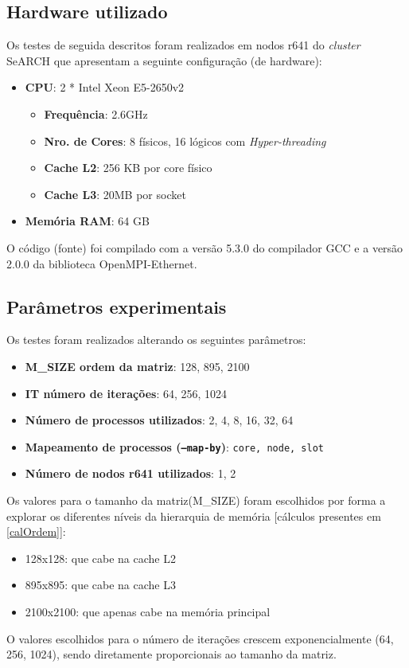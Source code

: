 \documentclass{article}
\begin{document}
\subsection{Hardware utilizado}
Os testes de seguida descritos foram realizados em nodos r641 do \textit{cluster} SeARCH que apresentam
a seguinte configuração (de hardware):
\begin{itemize}
    \item \textbf{CPU}: 2 * Intel Xeon E5-2650v2
        \begin{itemize}
            \item \textbf{Frequência}: 2.6GHz
            \item \textbf{Nro. de Cores}: 8 físicos, 16 lógicos com \textit{Hyper-threading}
            \item \textbf{Cache L2}: 256 KB por core físico
            \item \textbf{Cache L3}: 20MB por socket
        \end{itemize} 
    \item \textbf{Memória RAM}: 64 GB
\end{itemize}

O código (fonte) foi compilado com a versão 5.3.0 do compilador GCC e a versão 2.0.0 da biblioteca OpenMPI-Ethernet.

\subsection{Parâmetros experimentais}
Os testes foram realizados alterando os seguintes parâmetros:
\begin{itemize}
    \item \textbf{M\_SIZE ordem da matriz}: 128, 895, 2100
    \item \textbf{IT número de iterações}: 64, 256, 1024
    \item \textbf{Número de processos utilizados}: 2, 4, 8, 16, 32, 64
    \item \textbf{Mapeamento de processos (\texttt{--map-by})}: \texttt{core, node, slot}
    \item \textbf{Número de nodos r641 utilizados}: 1, 2
\end{itemize}
Os valores para o tamanho da matriz(M\_SIZE) foram escolhidos por forma a explorar os diferentes níveis da hierarquia 
de memória [cálculos presentes em \ref{calOrdem}]:
\begin{itemize}
    \item 128x128: que cabe na cache L2
    \item 895x895: que cabe na cache L3
    \item 2100x2100: que apenas cabe na memória principal
\end{itemize} 
O valores escolhidos para o número de iterações crescem exponencialmente (64, 256, 1024), sendo diretamente proporcionais ao tamanho da matriz.
\end{document}
